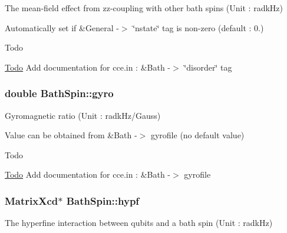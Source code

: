 The mean-\/field effect from zz-\/coupling with other bath spins (Unit \-: radk\-Hz) 

Automatically set if \&General -\/$>$ \char`\"{}nstate\char`\"{} tag is non-\/zero (default \-: 0.) \begin{DoxyRefDesc}{Todo}
\item[\hyperlink{todo__todo000007}{Todo}]Add documentation for cce.\-in \-: \&Bath -\/$>$ \char`\"{}disorder\char`\"{} tag \end{DoxyRefDesc}
\hypertarget{structBathSpin_a8c6487e73c2ef39b7a12d293ff5a1e4d}{
\subsubsection[{gyro}]{\setlength{\rightskip}{0pt plus 5cm}double Bath\-Spin\-::gyro}}\label{structBathSpin_a8c6487e73c2ef39b7a12d293ff5a1e4d}


Gyromagnetic ratio (Unit \-: radk\-Hz/\-Gauss) 

Value can be obtained from \&Bath -\/$>$ gyrofile (no default value) \begin{DoxyRefDesc}{Todo}
\item[\hyperlink{todo__todo000002}{Todo}]Add documentation for cce.\-in \-: \&Bath -\/$>$ gyrofile \end{DoxyRefDesc}
\hypertarget{structBathSpin_aad4ead2e39f4ae27fab5701662e7ee27}{
\subsubsection[{hypf}]{\setlength{\rightskip}{0pt plus 5cm}Matrix\-Xcd$\ast$ Bath\-Spin\-::hypf}}\label{structBathSpin_aad4ead2e39f4ae27fab5701662e7ee27}


The hyperfine interaction between qubits and a bath spin (Unit \-: radk\-Hz) 

